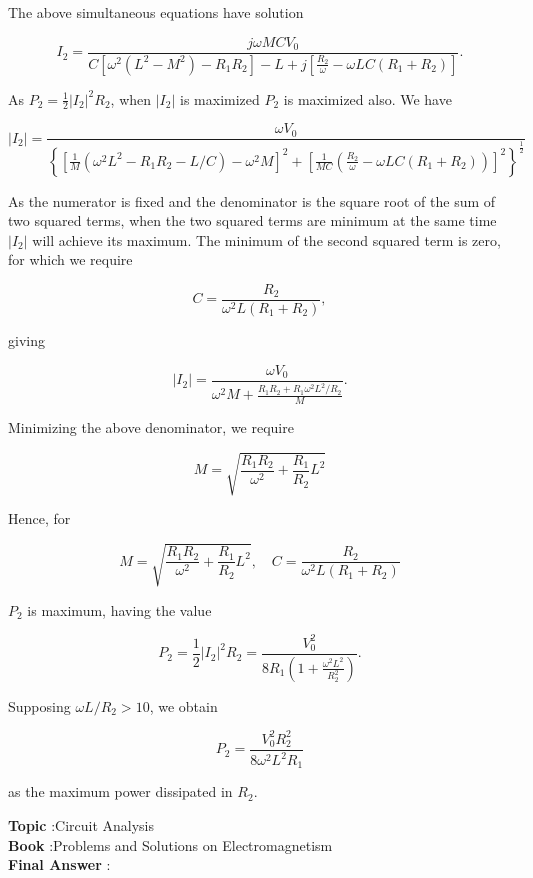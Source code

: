 \documentclass[10pt]{article}
\begin{document}
The above simultaneous equations have solution

$$
I_{2}=\frac{j \omega M C V_{0}}{C\left[\omega^{2}\left(L^{2}-M^{2}\right)-R_{1} R_{2}\right]-L+j\left[\frac{R_{2}}{\omega}-\omega L C\left(R_{1}+R_{2}\right)\right]} .
$$

As $P_{2}=\frac{1}{2}\left|I_{2}\right|^{2} R_{2}$, when $\left|I_{2}\right|$ is maximized $P_{2}$ is maximized also. We have

$$
\left|I_{2}\right|=\frac{\omega V_{0}}{\left\{\left[\frac{1}{M}\left(\omega^{2} L^{2}-R_{1} R_{2}-L / C\right)-\omega^{2} M\right]^{2}+\left[\frac{1}{M C}\left(\frac{R_{2}}{\omega}-\omega L C\left(R_{1}+R_{2}\right)\right)\right]^{2}\right\}^{\frac{1}{2}}}
$$

As the numerator is fixed and the denominator is the square root of the sum of two squared terms, when the two squared terms are minimum at the same time $\left|I_{2}\right|$ will achieve its maximum. The minimum of the second squared term is zero, for which we require

$$
C=\frac{R_{2}}{\omega^{2} L\left(R_{1}+R_{2}\right)},
$$

giving

$$
\left|I_{2}\right|=\frac{\omega V_{0}}{\omega^{2} M+\frac{R_{1} R_{2}+R_{1} \omega^{2} L^{2} / R_{2}}{M}} .
$$

Minimizing the above denominator, we require

$$
M=\sqrt{\frac{R_{1} R_{2}}{\omega^{2}}+\frac{R_{1}}{R_{2}} L^{2}}
$$

Hence, for

$$
M=\sqrt{\frac{R_{1} R_{2}}{\omega^{2}}+\frac{R_{1}}{R_{2}} L^{2}}, \quad C=\frac{R_{2}}{\omega^{2} L\left(R_{1}+R_{2}\right)}
$$

$P_{2}$ is maximum, having the value

$$
P_{2}=\frac{1}{2}\left|I_{2}\right|^{2} R_{2}=\frac{V_{0}^{2}}{8 R_{1}\left(1+\frac{\omega^{2} L^{2}}{R_{2}^{2}}\right)} .
$$

Supposing $\omega L / R_{2}>10$, we obtain

$$
P_{2}=\frac{V_{0}^{2} R_{2}^{2}}{8 \omega^{2} L^{2} R_{1}}
$$

as the maximum power dissipated in $R_{2}$.

\textbf{Topic} :Circuit Analysis\\
\textbf{Book} :Problems and Solutions on Electromagnetism\\
\textbf{Final Answer} :\\
\end{document}
